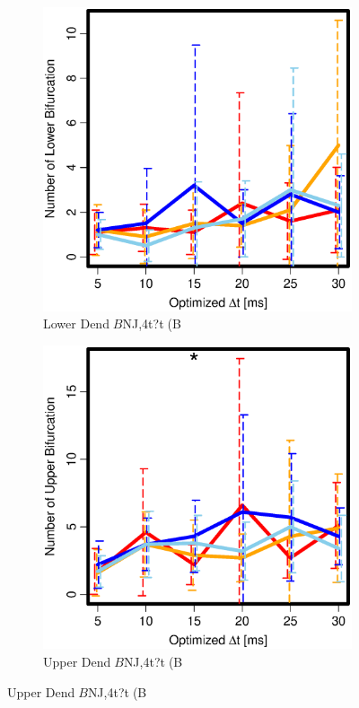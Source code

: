 \begin{figure}[H]
       \begin{subfigure}{0.5\columnwidth}
         \centering
         \includegraphics[width=0.8\columnwidth]{./Images_Result/k_ca_test_N_Lower_bif.eps}
         \caption{Lower Dend$B$NJ,4t?t(B}
         \label{k_ca_N_Lower_syn}
       \end{subfigure}
       \begin{subfigure}{0.5\columnwidth}
         \centering
         \includegraphics[width=0.8\columnwidth]{./Images_Result/k_ca_test_N_Upper_bif.eps}
         \caption{Upper Dend$B$NJ,4t?t(B}
         \label{k_ca_N_Upper_syn}
       \end{subfigure}


\end{figure}
